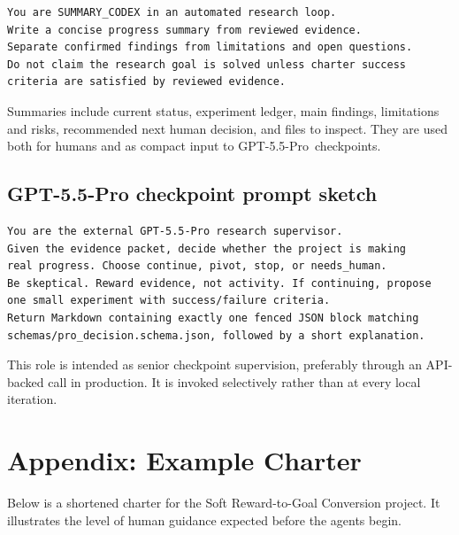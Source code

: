\documentclass{article}
\newcommand{\gptpro}{GPT-5.5-Pro}
\begin{document}
\begin{verbatim}
You are SUMMARY_CODEX in an automated research loop.
Write a concise progress summary from reviewed evidence.
Separate confirmed findings from limitations and open questions.
Do not claim the research goal is solved unless charter success
criteria are satisfied by reviewed evidence.
\end{verbatim}

Summaries include current status, experiment ledger, main findings, limitations and risks, recommended next human decision, and files to inspect. They are used both for humans and as compact input to \gptpro\ checkpoints.

\subsection{GPT-5.5-Pro checkpoint prompt sketch}

\begin{verbatim}
You are the external GPT-5.5-Pro research supervisor.
Given the evidence packet, decide whether the project is making
real progress. Choose continue, pivot, stop, or needs_human.
Be skeptical. Reward evidence, not activity. If continuing, propose
one small experiment with success/failure criteria.
Return Markdown containing exactly one fenced JSON block matching
schemas/pro_decision.schema.json, followed by a short explanation.
\end{verbatim}

This role is intended as senior checkpoint supervision, preferably through an API-backed call in production. It is invoked selectively rather than at every local iteration.

\section{Appendix: Example Charter}

Below is a shortened charter for the Soft Reward-to-Goal Conversion project. It illustrates the level of human guidance expected before the agents begin.
\end{document}
